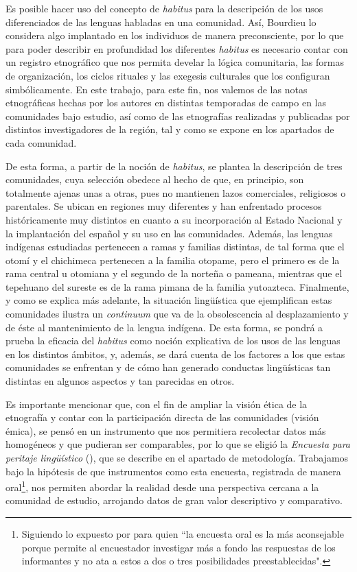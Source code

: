 \documentclass[output=paper]{../langscibook}
\begin{document}
Es posible hacer uso del concepto de \textit{habitus} para la descripción de los usos diferenciados de las lenguas habladas en una comunidad. Así, Bourdieu lo considera algo implantado en los individuos de manera preconsciente, por lo que para poder describir en profundidad los diferentes \textit{habitus} es necesario contar con un registro etnográfico que nos permita develar la lógica comunitaria, las formas de organización, los ciclos rituales y las exegesis culturales que los configuran simbólicamente. En este trabajo, para este fin, nos valemos de las notas etnográficas hechas por los autores en distintas temporadas de campo en las comunidades bajo estudio, así como de las etnografías realizadas y publicadas por distintos investigadores de la región, tal y como se expone en los apartados de cada comunidad.

De esta forma, a partir de la noción de \textit{habitus}, se plantea la descripción de tres comunidades, cuya selección obedece al hecho de que, en principio, son totalmente ajenas unas a otras, pues no mantienen lazos comerciales, religiosos o parentales. Se ubican en regiones muy diferentes y han enfrentado procesos históricamente muy distintos en cuanto a su incorporación al Estado Nacional y la implantación del español y su uso en las comunidades. Además, las lenguas indígenas estudiadas pertenecen a ramas y familias distintas, de tal forma que el otomí y el chichimeca pertenecen a la familia otopame, pero el primero es de la rama central u otomiana y el segundo de la norteña o pameana, mientras que el tepehuano del sureste es de la rama pimana de la familia yutoazteca. Finalmente, y como se explica más adelante, la situación lingüística que ejemplifican estas comunidades ilustra un \textit{continuum} que va de la obsolescencia al desplazamiento y de éste al mantenimiento de la lengua indígena. De esta forma, se pondrá a prueba la eficacia del \textit{habitus} como noción explicativa de los usos de las lenguas en los distintos ámbitos, y, además, se dará cuenta de los factores a los que estas comunidades se enfrentan y de cómo han generado conductas lingüísticas tan distintas en algunos aspectos y tan parecidas en otros.

Es importante mencionar que, con el fin de ampliar la visión ética de la etnografía y contar con la participación directa de las comunidades (visión émica), se pensó en un instrumento que nos permitiera recolectar datos más homogéneos y que pudieran ser comparables, por lo que se eligió la \textit{Encuesta para peritaje lingüístico} (\citealt{GuerreroGalván2009ms}), que se describe en el apartado de metodología. Trabajamos bajo la hipótesis de que instrumentos como esta encuesta, registrada de manera oral\footnote{Siguiendo lo expuesto por   \citet[65]{Silva-Corvalán2001} para quien “la encuesta oral es la más aconsejable porque permite al encuestador investigar más a fondo las respuestas de los informantes y no ata a estos a dos o tres posibilidades preestablecidas".}, nos permiten abordar la realidad desde una perspectiva cercana a la comunidad de estudio, arrojando datos de gran valor descriptivo y comparativo.
\end{document}
